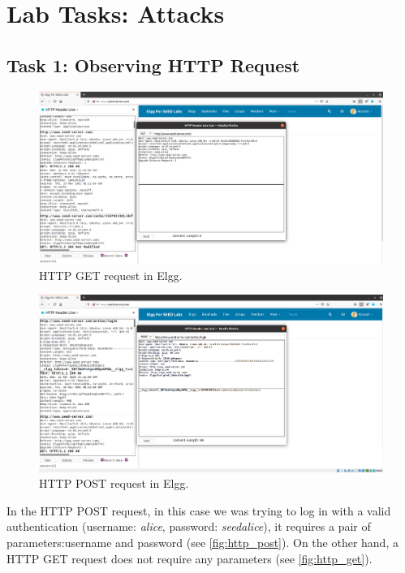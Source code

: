\section{Lab Tasks: Attacks}
\subsection{Task 1: Observing HTTP Request}
%
\begin{figure}
    \centering
    \includegraphics[width=\textwidth,height=\textheight,keepaspectratio]
    {figures/HTTP_GET.png}
    \caption{HTTP GET request in Elgg.}\label{fig:http_get}
\end{figure}

\begin{figure}
    \centering
    \includegraphics[width=\textwidth,height=\textheight,keepaspectratio]
    {figures/HTTP_POST.png}
    \caption{HTTP POST request in Elgg.}\label{fig:http_post}
\end{figure}

In the HTTP POST request, in this case we was trying to log in with a valid
authentication (username: \emph{alice}, password: \emph{seedalice}), it requires
a pair of parameters:{\selectfont username} and
{\selectfont password} (see \autoref{fig:http_post}).
On the other hand, a HTTP GET request does not require any parameters
(see \autoref{fig:http_get}).